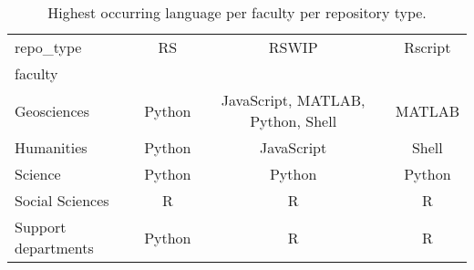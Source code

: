 \begin{table}
\centering
\caption{Highest occurring language per faculty per repository type.}
\label{tab:highest_language}
\begin{tabular}{lccc}
\toprule
repo\_type &      RS &                              RSWIP & Rscript \\
faculty             &         &                                    &         \\
\midrule
Geosciences         &  Python &  JavaScript, MATLAB, Python, Shell &  MATLAB \\
Humanities          &  Python &                         JavaScript &   Shell \\
Science             &  Python &                             Python &  Python \\
Social Sciences     &       R &                                  R &       R \\
Support departments &  Python &                                  R &       R \\
\bottomrule
\end{tabular}
\end{table}
